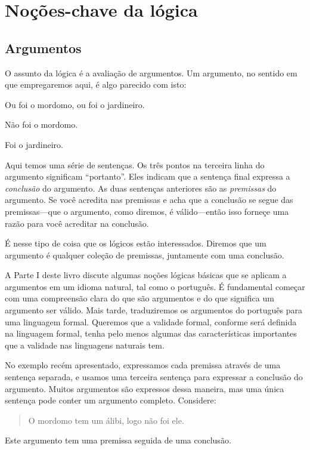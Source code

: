 \part{Noções-chave da lógica}
\label{ch.intro}


\chapter{Argumentos}
\label{s:Arguments}

O assunto da lógica é a avaliação de argumentos.  Um argumento, no sentido em que empregaremos aqui, é algo parecido com isto:

	\begin{earg}\label{argButlerGardner}
		\item[] Ou foi o mordomo, ou foi o jardineiro.
		\item[] Não foi o mordomo.
		\item[\therefore] Foi o jardineiro.
	\end{earg}
Aqui temos uma série de sentenças.
Os três pontos na terceira linha do argumento significam ``portanto''.
Eles indicam que a sentença final expressa a \emph{conclusão} do argumento.
As duas sentenças anteriores são as \emph{premissas} do argumento.
Se você acredita nas premissas e acha que a conclusão se segue das premissas---que o argumento, como diremos, é válido---então isso forneçe uma razão para você acreditar na conclusão.

É nesse tipo de coisa que os lógicos estão interessados. Diremos que um argumento é qualquer coleção de premissas, juntamente com uma conclusão.

A Parte I deste livro discute algumas noções lógicas básicas que se aplicam a argumentos em um idioma natural, tal como o português.
É fundamental começar com uma compreensão clara do que são argumentos e do que significa um argumento ser válido.
Mais tarde, traduziremos os argumentos do português para uma linguagem formal. Queremos que a validade formal, conforme será definida na linguagem formal, tenha pelo menos algumas das características importantes que a validade nas linguagens naturais tem.

No exemplo recém apresentado, expressamos cada premissa através de uma sentença separada, e usamos uma terceira sentença para expressar a conclusão do argumento.
Muitos argumentos são expressos dessa maneira, mas uma única sentença pode conter um argumento completo.
Considere:
	\begin{quote}
		O mordomo tem um álibi, logo não foi ele.
	\end{quote}
Este argumento tem uma premissa seguida de uma conclusão.

